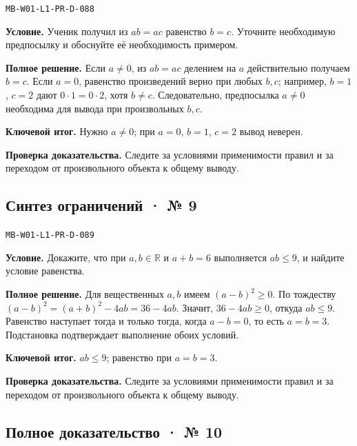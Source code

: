 \documentclass[11pt,a4paper,openany]{book}
\newcommand{\muid}[1]{\texttt{\footnotesize #1}}
\begin{document}
\muid{MB-W01-L1-PR-D-088}\par

\textbf{Условие.} Ученик получил из $ab=ac$ равенство $b=c$. Уточните необходимую предпосылку и обоснуйте её необходимость примером.\par

\textbf{Полное решение.} Если $a\ne0$, из $ab=ac$ делением на $a$ действительно получаем $b=c$. Если $a=0$, равенство произведений верно при любых $b,c$; например, $b=1$, $c=2$ дают $0\cdot1=0\cdot2$, хотя $b\ne c$. Следовательно, предпосылка $a\ne0$ необходима для вывода при произвольных $b,c$.


\begin{learnbox}\textbf{Ключевой итог.} Нужно $a\ne0$; при $a=0$, $b=1$, $c=2$ вывод неверен.\par \textbf{Проверка доказательства.} 
Следите за условиями применимости правил и за переходом от произвольного объекта к общему выводу. 
\end{learnbox}

\subsection*{Синтез ограничений · № 9}\hypertarget{solution:MB-W01-L1-PR-D-089}{}

\muid{MB-W01-L1-PR-D-089}\par

\textbf{Условие.} Докажите, что при $a,b\in\mathbb R$ и $a+b=6$ выполняется $ab\le9$, и найдите условие равенства.\par

\textbf{Полное решение.} Для вещественных $a,b$ имеем $(a-b)^2\ge0$. По тождеству $(a-b)^2=(a+b)^2-4ab=36-4ab$. Значит, $36-4ab\ge0$, откуда $ab\le9$. Равенство наступает тогда и только тогда, когда $a-b=0$, то есть $a=b=3$. Подстановка подтверждает выполнение обоих условий.


\begin{learnbox}\textbf{Ключевой итог.} $ab\le9$; равенство при $a=b=3$.\par \textbf{Проверка доказательства.} 
Следите за условиями применимости правил и за переходом от произвольного объекта к общему выводу. 
\end{learnbox}

\subsection*{Полное доказательство · № 10}\hypertarget{solution:MB-W01-L1-PR-D-090}{}
\end{document}
